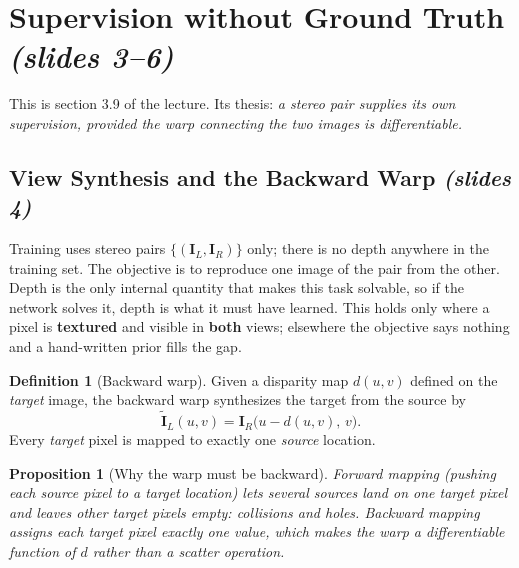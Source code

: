 \documentclass[11pt,a4paper]{article}
\numberwithin{equation}{section}
\newcommand{\slides}[1]{\texorpdfstring{\;\emph{(slides #1)}}{ (slides #1)}}
\theoremstyle{plain}
\newtheorem{proposition}[theorem]{Proposition}
\theoremstyle{definition}
\newtheorem{definition}[theorem]{Definition}
\begin{document}
\section{Supervision without Ground Truth \slides{3--6}}
This is section 3.9 of the lecture. Its thesis: \emph{a stereo pair supplies its own supervision, provided the warp connecting the two images is differentiable.}

\subsection{View Synthesis and the Backward Warp \slides{4}}
Training uses stereo pairs $\{(\bm I_L,\bm I_R)\}$ only; there is no depth anywhere in the training set. The objective is to reproduce one image of the pair from the other. Depth is the only internal quantity that makes this task solvable, so if the network solves it, depth is what it must have learned. This holds only where a pixel is \textbf{textured} and visible in \textbf{both} views; elsewhere the objective says nothing and a hand-written prior fills the gap.

\begin{definition}[Backward warp]
Given a disparity map $d(u,v)$ defined on the \emph{target} image, the backward warp synthesizes the target from the source by
\begin{equation}
\tilde{\bm I}_L(u,v)=\bm I_R\bigl(u-d(u,v),\,v\bigr).
\end{equation}
Every \emph{target} pixel is mapped to exactly one \emph{source} location.
\end{definition}

\begin{proposition}[Why the warp must be backward]
Forward mapping (pushing each source pixel to a target location) lets several sources land on one target pixel and leaves other target pixels empty: collisions and holes. Backward mapping assigns each target pixel exactly one value, which makes the warp a \emph{differentiable function} of $d$ rather than a scatter operation.
\end{proposition}
\end{document}
